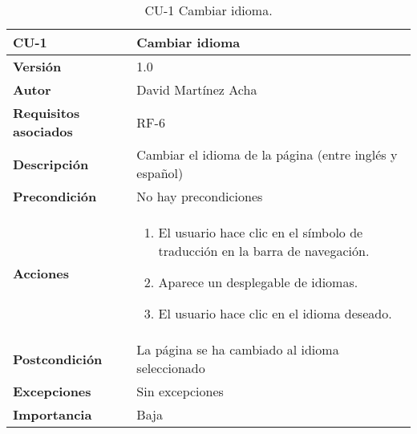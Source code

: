 \begin{table}[p]
	\centering
	\begin{tabularx}{\linewidth}{ p{} p{} }
		\toprule
		\textbf{CU-1}    & \textbf{Cambiar idioma}\\
		\toprule
		\textbf{Versión}              & 1.0    \\
		\textbf{Autor}                & David Martínez Acha \\
		\textbf{Requisitos asociados} & RF-6 \\
		\textbf{Descripción}          & Cambiar el idioma de la página (entre inglés y español) \\
		\textbf{Precondición}         & No hay precondiciones \\
		\textbf{Acciones}             &
		\begin{enumerate}
			\def\labelenumi{\arabic{enumi}.}
			\tightlist
			\item El usuario hace clic en el símbolo de traducción en la barra de navegación.
            \item Aparece un desplegable de idiomas.
            \item El usuario hace clic en el idioma deseado.
		\end{enumerate}\\
		\textbf{Postcondición}        & La página se ha cambiado al idioma seleccionado \\
		\textbf{Excepciones}          & Sin excepciones \\
		\textbf{Importancia}          & Baja \\
		\bottomrule
	\end{tabularx}
	\caption{CU-1 Cambiar idioma.}
\end{table}
